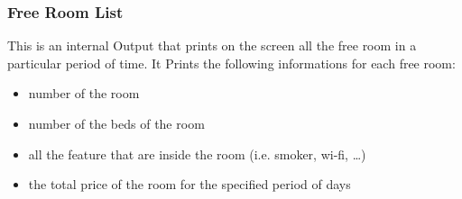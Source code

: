 \subsubsection{Free Room List}
This is an internal Output that prints on the screen all the free room in a particular period of time. It Prints the following informations for each free room:

\begin{itemize}
  \item number of the room
  \item number of the beds of the room
  \item all the feature that are inside the room (i.e. smoker, wi-fi, …)
  \item the total price of the room for the specified period of days
\end{itemize}
